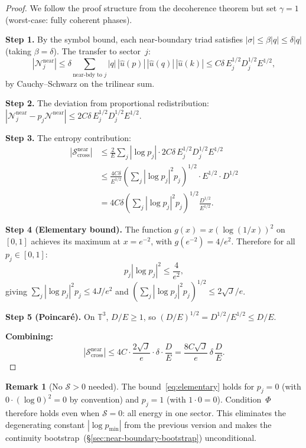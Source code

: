 \documentclass[11pt]{article}
\theoremstyle{definition}
\newtheorem{remark}[theorem]{Remark}
\newcommand{\T}{\mathbb{T}}
\newcommand{\cS}{\mathcal{S}}
\newcommand{\cN}{\mathcal{N}}
\begin{document}
\begin{proof}
We follow the proof structure from the decoherence theorem
but set $\gamma = 1$ (worst-case: fully coherent phases).

\textbf{Step 1.}
By the symbol bound, each near-boundary triad satisfies
$|\sigma| \leq \beta|q| \leq \delta|q|$ (taking
$\beta = \delta$).  The transfer to sector~$j$:
\begin{equation}
|\cN_j^{\mathrm{near}}|
\leq \delta\sum_{\text{near-bdy to }j}
|q|\,|\hat{u}(p)|\,|\hat{u}(q)|\,|\hat{u}(k)|
\leq C\delta\,E_j^{1/2}D_j^{1/2}E^{1/2},
\end{equation}
by Cauchy--Schwarz on the trilinear sum.

\textbf{Step 2.}
The deviation from proportional redistribution:
$|\cN_j^{\mathrm{near}} - p_j\cN^{\mathrm{near}}|
\leq 2C\delta\,E_j^{1/2}D_j^{1/2}E^{1/2}$.

\textbf{Step 3.}
The entropy contribution:
\begin{align}
|\cS_{\mathrm{cross}}^{\mathrm{near}}|
&\leq \frac{2}{E}\sum_j |\log p_j|\cdot
2C\delta\,E_j^{1/2}D_j^{1/2}E^{1/2}
\nonumber\\
&\leq \frac{4C\delta}{E^{1/2}}
\left(\sum_j|\log p_j|^2 p_j\right)^{1/2}
\!\cdot E^{1/2}\cdot D^{1/2}
\nonumber\\
&= 4C\delta\left(\sum_j|\log p_j|^2 p_j\right)^{1/2}
\frac{D^{1/2}}{E^{1/2}}.
\label{eq:before-elementary}
\end{align}

\textbf{Step 4 (Elementary bound).}
The function $g(x) = x(\log(1/x))^2$ on $[0,1]$ achieves its
maximum at $x = e^{-2}$, with $g(e^{-2}) = 4/e^2$.
Therefore for all $p_j \in [0,1]$:
\begin{equation}\label{eq:elementary}
p_j|\log p_j|^2 \leq \frac{4}{e^2},
\end{equation}
giving $\sum_j |\log p_j|^2 p_j \leq 4J/e^2$ and
$(\sum_j |\log p_j|^2 p_j)^{1/2} \leq 2\sqrt{J}/e$.

\textbf{Step 5 (Poincar\'e).}
On $\T^3$, $D/E \geq 1$, so
$(D/E)^{1/2} = D^{1/2}/E^{1/2} \leq D/E$.

\textbf{Combining:}
\begin{equation}
|\cS_{\mathrm{cross}}^{\mathrm{near}}|
\leq 4C\cdot\frac{2\sqrt{J}}{e}\cdot\delta\cdot\frac{D}{E}
= \frac{8C\sqrt{J}}{e}\,\delta\,\frac{D}{E}.
\end{equation}
\end{proof}

\begin{remark}[No $\cS > 0$ needed]
\label{rem:no-S-needed}
The bound~\eqref{eq:elementary} holds for $p_j = 0$
(with $0\cdot(\log 0)^2 = 0$ by convention) and
$p_j = 1$ (with $1\cdot 0 = 0$).  Condition~$\Phi$
therefore holds even when $\cS = 0$: all energy in one
sector.  This eliminates the degenerating constant
$|\log p_{\min}|$ from the previous version and makes the
continuity bootstrap~(\S\ref{sec:near-boundary-bootstrap})
unconditional.
\end{remark}
\end{document}
